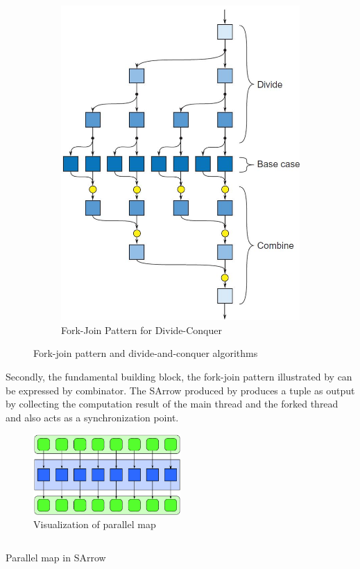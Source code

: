 \begin{figure}[ht]
\begin{subfigure}[b]{0.475\textwidth}
        \includegraphics[width=\textwidth]{arrow/dq.png}
        \caption{Fork-Join Pattern for Divide-Conquer \cite{mccoolStructuredParallelPrograming2012}}
        \label{SArrow:fig:dq}
    \end{subfigure}
    \caption{Fork-join pattern and divide-and-conquer algorithms}
\end{figure}

Secondly, the fundamental building block, the fork-join pattern illustrated by  can be expressed by \hask{&&&} combinator. The SArrow produced by \hask{&&&} produces a tuple as output by collecting the computation result of the main thread and the forked thread and also acts as a synchronization point.

\begin{figure}[ht]
    \centering
    \includegraphics[width=0.5\textwidth]{arrow/pmap.png} 
    \caption{Visualization of parallel map \cite{mccoolStructuredParallelPrograming2012}}
    \label{arrow:fig:pmap}
\end{figure}
\begin{listing}[ht]
    \inputminted{Haskell}{arrow/pmap.hs}
    \caption{Parallel map in SArrow}
    \label{arrow:code:pmap}
\end{listing}

